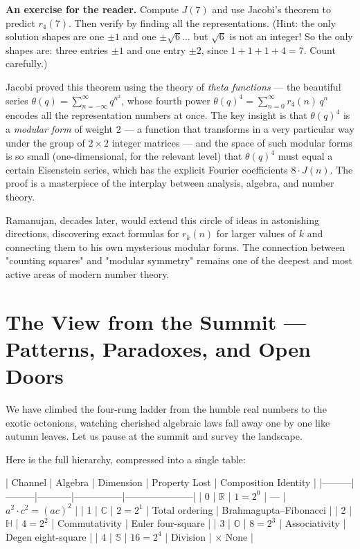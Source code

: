 \documentclass[11pt,twoside,openright]{book}
\theoremstyle{definition}
\theoremstyle{remark}
\begin{document}
\textbf{An exercise for the reader.} Compute $J(7)$ and use Jacobi's theorem to predict $r_4(7)$. Then verify by finding all the representations. (Hint: the only solution shapes are one $\pm 1$ and one $\pm\sqrt{6}$... but $\sqrt{6}$ is not an integer! So the only shapes are: three entries $\pm 1$ and one entry $\pm 2$, since $1 + 1 + 1 + 4 = 7$. Count carefully.)

Jacobi proved this theorem using the theory of \textit{theta functions} --- the beautiful series $\theta(q) = \sum_{n=-\infty}^{\infty} q^{n^2}$, whose fourth power $\theta(q)^4 = \sum_{n=0}^{\infty} r_4(n)\, q^n$ encodes all the representation numbers at once. The key insight is that $\theta(q)^4$ is a \textit{modular form} of weight $2$ --- a function that transforms in a very particular way under the group of $2 \times 2$ integer matrices --- and the space of such modular forms is so small (one-dimensional, for the relevant level) that $\theta(q)^4$ must equal a certain Eisenstein series, which has the explicit Fourier coefficients $8 \cdot J(n)$. The proof is a masterpiece of the interplay between analysis, algebra, and number theory.

Ramanujan, decades later, would extend this circle of ideas in astonishing directions, discovering exact formulas for $r_k(n)$ for larger values of $k$ and connecting them to his own mysterious modular forms. The connection between "counting squares" and "modular symmetry" remains one of the deepest and most active areas of modern number theory.


\section{The View from the Summit --- Patterns, Paradoxes, and Open Doors}

We have climbed the four-rung ladder from the humble real numbers to the exotic octonions, watching cherished algebraic laws fall away one by one like autumn leaves. Let us pause at the summit and survey the landscape.

Here is the full hierarchy, compressed into a single table:

| Channel | Algebra | Dimension | Property Lost | Composition Identity |
|---------|---------|-----------|---------------|---------------------|
| 0 | $\mathbb{R}$ | $1 = 2^0$ | --- | $a^2 \cdot c^2 = (ac)^2$ |
| 1 | $\mathbb{C}$ | $2 = 2^1$ | Total ordering | Brahmagupta--Fibonacci |
| 2 | $\mathbb{H}$ | $4 = 2^2$ | Commutativity | Euler four-square |
| 3 | $\mathbb{O}$ | $8 = 2^3$ | Associativity | Degen eight-square |
| 4 | $\mathbb{S}$ | $16 = 2^4$ | Division | $\times$ None |
\end{document}
